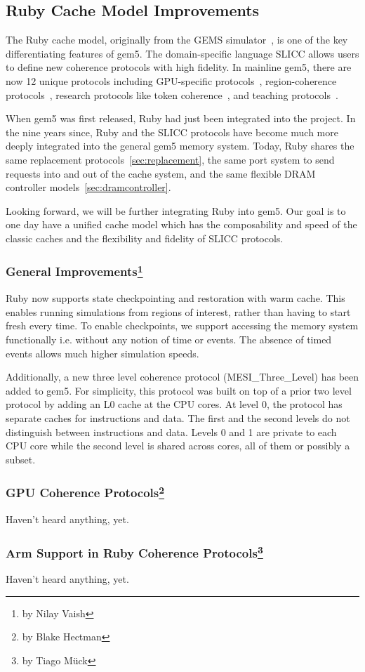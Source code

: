 \subsection[Ruby Cache Model Improvements]{Ruby Cache Model Improvements}
\label{sec:ruby}

The Ruby cache model, originally from the GEMS simulator~\cite{}, is one of the key differentiating features of gem5.
The domain-specific language SLICC allows users to define new coherence protocols with high fidelity.
In mainline gem5, there are now 12 unique protocols including GPU-specific protocols~\cite{viper}, region-coherence protocols~\cite{Power2012hsc}, research protocols like token coherence~\cite{token-coherence}, and teaching protocols~\cite{coherence-primer}.

When gem5 was first released, Ruby had just been integrated into the project.
In the nine years since, Ruby and the SLICC protocols have become much more deeply integrated into the general gem5 memory system.
Today, Ruby shares the same replacement protocols~\ref{sec:replacement}, the same port system to send requests into and out of the cache system, and the same flexible DRAM controller models~\ref{sec:dramcontroller}.

Looking forward, we will be further integrating Ruby into gem5.
Our goal is to one day have a unified cache model which has the composability and speed of the classic caches and the flexibility and fidelity of SLICC protocols.

\subsubsection[General Improvements]{General Improvements\footnote{by Nilay Vaish}}

Ruby now supports state checkpointing and restoration with warm cache.
This enables running simulations from regions of interest, rather than having to start fresh every time.
To enable checkpoints, we support accessing the memory system functionally i.e. without any notion of time or events.
The absence of timed events allows much higher simulation speeds.

Additionally, a new three level coherence protocol (MESI\_Three\_Level) has been added to gem5.
For simplicity, this protocol was built on top of a prior two level protocol by adding an L0 cache at the CPU cores.
At level 0, the protocol has separate caches for instructions and data.
The first and the second levels do not distinguish between instructions and data.
Levels 0 and 1 are private to each CPU core while the second level is shared across cores, all of them or possibly a subset.

\subsubsection[GPU Coherence Protocols]{GPU Coherence Protocols\footnote{by Blake Hectman}}

Haven't heard anything, yet.

\subsubsection[Arm Support and Extensions]{Arm Support in Ruby Coherence Protocols\footnote{by Tiago M{\"u}ck}}

Haven't heard anything, yet.
